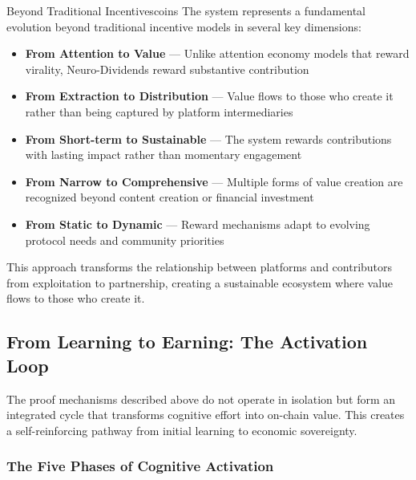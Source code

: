 \begin{mfai-box}{Beyond Traditional Incentives}{coins}
The  system represents a fundamental evolution beyond traditional incentive models in several key dimensions:

\begin{itemize}
    \item \textbf{From Attention to Value} — Unlike attention economy models that reward virality, Neuro-Dividends reward substantive contribution
    
    \item \textbf{From Extraction to Distribution} — Value flows to those who create it rather than being captured by platform intermediaries
    
    \item \textbf{From Short-term to Sustainable} — The system rewards contributions with lasting impact rather than momentary engagement
    
    \item \textbf{From Narrow to Comprehensive} — Multiple forms of value creation are recognized beyond content creation or financial investment
    
    \item \textbf{From Static to Dynamic} — Reward mechanisms adapt to evolving protocol needs and community priorities
\end{itemize}

This approach transforms the relationship between platforms and contributors from exploitation to partnership, creating a sustainable ecosystem where value flows to those who create it.
\end{mfai-box}

\subsection{From Learning to Earning: The Activation Loop}

The proof mechanisms described above do not operate in isolation but form an integrated cycle that transforms cognitive effort into on-chain value. This  creates a self-reinforcing pathway from initial learning to economic sovereignty.

\subsubsection*{The Five Phases of Cognitive Activation}


